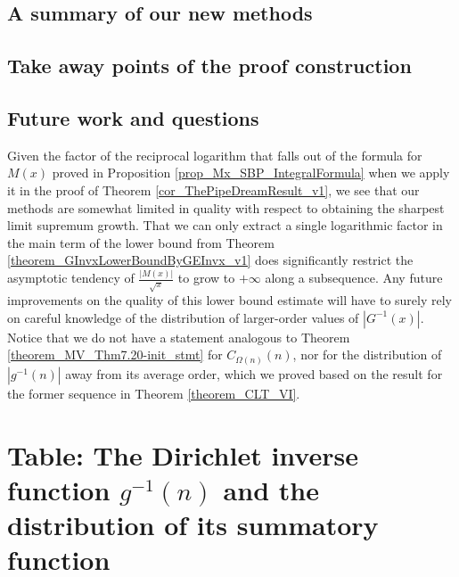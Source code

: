 \documentclass[11pt,reqno,a4letter]{article}
\numberwithin{figure}{section}
\numberwithin{table}{section}
\theoremstyle{plain}
\numberwithin{theorem}{section}
\theoremstyle{definition}
\begin{document}
\subsection{A summary of our new methods} 


\subsection{Take away points of the proof construction} 


\subsection{Future work and questions} 

Given the factor of the reciprocal logarithm that falls out of the formula for 
$M(x)$ proved in Proposition \ref{prop_Mx_SBP_IntegralFormula} 
when we apply it in the proof 
of Theorem \ref{cor_ThePipeDreamResult_v1}, 
we see that our methods are somewhat limited in quality with respect 
to obtaining the sharpest limit supremum growth. 
That we can only extract a single logarithmic factor in the main term of the 
lower bound from Theorem \ref{theorem_GInvxLowerBoundByGEInvx_v1} does 
significantly restrict the asymptotic tendency of $\frac{|M(x)|}{\sqrt{x}}$ to grow to 
$+\infty$ along a subsequence. Any future improvements on the quality of this 
lower bound estimate will have to surely rely on careful knowledge of 
the distribution of larger-order values of $|G^{-1}(x)|$. Notice that we 
do not have a statement analogous to Theorem \ref{theorem_MV_Thm7.20-init_stmt} for 
$C_{\Omega(n)}(n)$, nor for the distribution of $|g^{-1}(n)|$ away from its 
average order, which we proved based on the result for the former sequence in 
Theorem \ref{theorem_CLT_VI}. 



\newpage 
\renewcommand{\refname}{References} 
{}


\newpage
\setcounter{section}{0} 
\renewcommand{\thesection}{T.\arabic{section}} 

\section{Table: The Dirichlet inverse function $g^{-1}(n)$ and the 
         distribution of its summatory function} 
\label{table_conjecture_Mertens_ginvSeq_approx_values}
\end{document}
